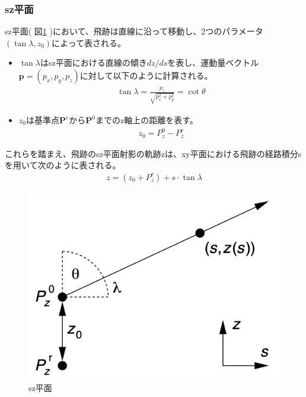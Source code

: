 \subsubsection{sz平面}
sz平面( 図\ref{sz} )において、飛跡は直線に沿って移動し、2つのパラメータ$(\tan \lambda, z_0)$によって表される。
\begin{itemize}
\item $\tan \lambda$はsz平面における直線の傾き$dz/ds$を表し、運動量ベクトル $\mathbf{p} = \left( p_x, p_y, p_z \right)$に対して以下のように計算される。
\begin{align}
\tan \lambda =\frac{p_z}{\sqrt{p_x^2 + p_y^2}} = \cot \theta
\end{align}
\item $z_0$は基準点$\mathbf{P}^r$から$\mathbf{P}^0$までのz軸上の距離を表す。\\
\begin{align}
z_0 = P_z^0 - P_z^r
\end{align}
\end{itemize}
これらを踏まえ、飛跡のsz平面射影の軌跡zは、xy平面における飛跡の経路積分sを用いて次のように表される。
\begin{align}
z = ( z_0 + P_z^r) + s \cdot \tan \lambda
\end{align}
\begin{figure}[H]
	\begin{center}
 \includegraphics[keepaspectratio, scale=0.4]
 	{Figure/Appendix/sz.png}
 		\caption{sz平面}
 		\label{sz}
	\end{center}
\end{figure}
